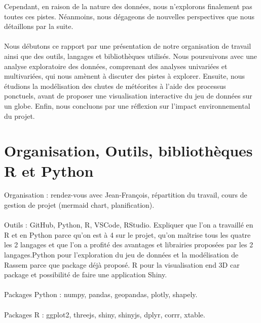 \documentclass[12pt]{article}
\begin{document}
Cependant, en raison de la nature des données, nous n'explorons finalement pas toutes ces pistes. Néanmoins, nous dégageons de nouvelles perspectives que nous détaillons par la suite.\\
\\
Nous débutons ce rapport par une présentation de notre organisation de travail ainsi que des outils, langages et bibliothèques utilisés. Nous poursuivons avec une analyse exploratoire des données, comprenant des analyses univariées et multivariées, qui nous amènent à discuter des pistes à explorer. Ensuite, nous étudions la modélisation des chutes de météorites à l'aide des processus ponctuels, avant de proposer une visualisation interactive du jeu de données sur un globe. Enfin, nous concluons par une réflexion sur l'impact environnemental du projet.\\
\newpage

\section{Organisation, Outils, bibliothèques R et Python}
Organisation : rendez-vous avec Jean-François, répartition du travail, cours de gestion de projet (mermaid chart, planification).\\
\\
Outils : GitHub, Python, R, VSCode, RStudio. Expliquer que l'on a travaillé en R et en Python parce qu'on est à 4 sur le projet, qu'on maîtrise tous les quatre les 2 langages et que l'on a profité des avantages et librairies proposées par les 2 langages.Python pour l'exploration du jeu de données et la modélisation de Rassem parce que package déjà proposé. R pour la visualisation end 3D car package et possibilité de faire une application Shiny.\\
\\
Packages Python : numpy, pandas, geopandas, plotly, shapely.\\
\\
Packages R : ggplot2, threejs, shiny, shinyjs, dplyr, corrr, xtable.\\ 
\\
\end{document}
